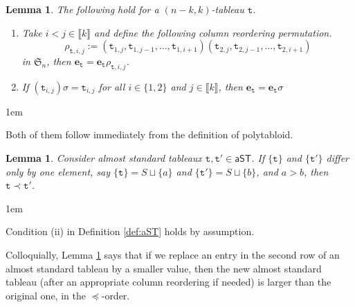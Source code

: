 \documentclass[a4paper]{amsart}
\makeatletter
\numberwithin{equation}{subsection}
\newtheorem{lemma}[theorem]{Lemma}
\theoremstyle{definition}
\newcommand{\interval}[1]{\llbracket #1 \rrbracket}
\newcommand{\bfe}{\pmb{e}}
\newcommand{\tbx}{\mathtt{t}}
\newcommand{\aST}{\mathsf{aST}}
\renewenvironment{proof}[1][\proofname]{\par
	\pushQED{\qed}%
	\normalfont \topsep0\p@\@plus6\p@ \labelsep1em\relax
	\trivlist
	\item[\hskip\labelsep\bfseries #1]\ignorespaces
	\mbox{}%
}{
	\popQED\endtrivlist\@endpefalse
}
\numberwithin{equation}{subsection}
\makeatother
\begin{document}
\begin{lemma}\label{lem:col-swap}
The following hold for a $(n-k,k)$-tableau $\tbx$.
\begin{enumerate}[(1)]
\item Take $i<j\in\interval{k}$ and define the following \emph{column reordering} permutation. 
\[
\rho_{\tbx,i,j} := (\tbx_{1,j}, \tbx_{1,j-1}, \ldots, \tbx_{1,i+1})(\tbx_{2,j}, \tbx_{2,j-1}, \ldots, \tbx_{2,i+1})
\]
in $\mathfrak{S}_n$, then $\bfe_{\tbx}=\bfe_{\tbx}\rho_{\tbx,i,j}$.

\item If $(\tbx_{i,j})\sigma=\tbx_{i,j}$ for all $i\in\{1,2\}$ and $j\in\interval{k}$, then $\bfe_{\tbx}=\bfe_{\tbx}\sigma$
\end{enumerate}
\end{lemma}
\begin{proof}
Both of them follow immediately from the definition of polytabloid.
\end{proof}

\begin{lemma}\label{lem:bad-swap}
Consider almost standard tableaux $\tbx,\tbx'\in \aST$.
If $\{\tbx\}$ and $\{\tbx'\}$ differ only by one element, say $\{\tbx\}=S\sqcup\{a\}$ and $\{\tbx'\}=S\sqcup \{b\}$, and $a>b$, then $\tbx\prec \tbx'$.
\end{lemma}
\begin{proof}
Condition (ii) in Definition \ref{def:aST} holds by assumption.
\end{proof}
Colloquially, Lemma \ref{lem:bad-swap} says that if we replace an entry in the second row of an almost standard tableau by a smaller value, then the new almost standard tableau (after an appropriate column reordering if needed) is larger than the original one, in the $\preceq$-order.
\end{document}
